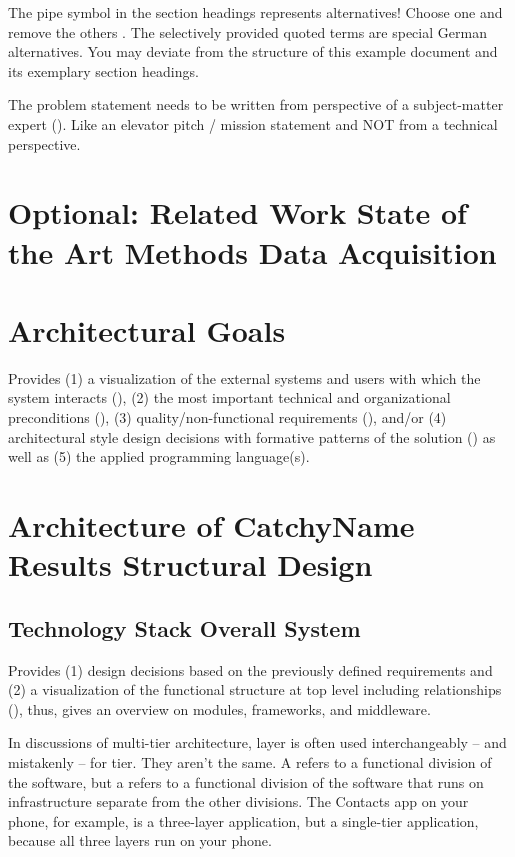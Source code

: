 \documentclass[conference,a4paper]{cs-techrep}
\begin{document}
The pipe symbol \textquote{\textbar{}} in the section headings represents alternatives! Choose one and remove the others \faWarning{}. The selectively provided quoted terms are special German alternatives. You may deviate from the structure of this example document and its exemplary section headings.

The problem statement needs to be written from perspective of a subject-matter expert (). Like an elevator pitch / mission statement \faWarning{} and NOT from a technical perspective.

\section{Optional: Related Work \textbar{} State of the Art \textbar{} Methods \textbar{} Data Acquisition}
\lipsum[2]

\section{Architectural Goals} %
Provides
(1) a visualization of the external systems and users with which the system interacts (),
(2) the most important technical and organizational preconditions (),
(3) quality/non-functional requirements (), and/or
(4) architectural style design decisions with formative patterns of the solution ()
as well as (5) the applied programming language(s).

\section{Architecture of CatchyName \textbar{} Results \textbar{} Structural Design \textbar{} }

\subsection{Technology Stack \textbar{} Overall System} %
Provides
(1) design decisions based on the previously defined requirements and
(2) a visualization of the functional structure at top level including relationships (), thus, gives an overview on modules, frameworks, and middleware.

In discussions of multi-tier architecture, layer is often used interchangeably -- and mistakenly -- for tier. They aren't the same. A  refers to a functional division of the software, but a  refers to a functional division of the software that runs on infrastructure separate from the other divisions. The Contacts app on your phone, for example, is a three-layer application, but a single-tier application, because all three layers run on your phone.
\end{document}
